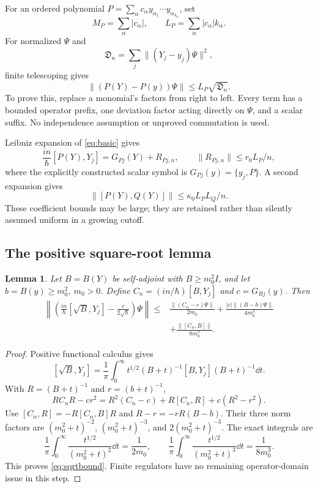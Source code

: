 \documentclass[11pt]{article}
\newtheorem{lemma}[theorem]{Lemma}
\begin{document}
For an ordered polynomial $P=\sum_\alpha c_\alpha y_{\alpha_1}\cdots y_{\alpha_{k_\alpha}}$, set
\[
M_P=\sum_\alpha|c_\alpha|,
\qquad L_P=\sum_\alpha|c_\alpha|k_\alpha.
\]
For normalized $\Psi$ and
\begin{equation}\label{eq:D}
\mathfrak D_n=\sum_j\|(Y_j-y_j)\Psi\|^2,
\end{equation}
finite telescoping gives
\begin{equation}\label{eq:tel}
\|(P(Y)-P(y))\Psi\|\le L_P\sqrt{\mathfrak D_n}.
\end{equation}
To prove this, replace a monomial's factors from right to left. Every term has a bounded operator prefix, one deviation factor acting directly on $\Psi$, and a scalar suffix. No independence assumption or unproved commutation is used.

Leibniz expansion of \eqref{eq:basic} gives
\begin{equation}
\frac{in}{\hbar}[P(Y),Y_j]=G_{Pj}(Y)+R_{Pj,n},
\qquad \|R_{Pj,n}\|\le r_0L_P/n,
\end{equation}
where the explicitly constructed scalar symbol is $G_{Pj}(y)=\{y_j,P\}$. A second expansion gives
\begin{equation}\label{eq:polycomm}
\|[P(Y),Q(Y)]\|\le\kappa_0L_PL_Q/n.
\end{equation}
These coefficient bounds may be large; they are retained rather than silently assumed uniform in a growing cutoff.

\subsection{The positive square-root lemma}
\begin{lemma}\label{lem:sqrt}
Let $B=B(Y)$ be self-adjoint with $B\ge m_0^2I$, and let $b=B(y)\ge m_0^2$, $m_0>0$. Define $C_n=(in/\hbar)[B,Y_j]$ and $c=G_{Bj}(y)$. Then
\begin{equation}\label{eq:sqrtbound}
\begin{split}
\left\|\left(\frac{in}{\hbar}[\sqrt B,Y_j]-\frac{c}{2\sqrt b}\right)\Psi\right\|
\le{}&\frac{\|(C_n-c)\Psi\|}{2m_0}
+\frac{|c|\|(B-b)\Psi\|}{4m_0^3}\\
&+\frac{\|[C_n,B]\|}{8m_0^3}.
\end{split}
\end{equation}
\end{lemma}
\begin{proof}
Positive functional calculus gives
\[
[\sqrt B,Y_j]=\frac1\pi\int_0^\infty
t^{1/2}(B+t)^{-1}[B,Y_j](B+t)^{-1}\dd t.
\]
With $R=(B+t)^{-1}$ and $r=(b+t)^{-1}$,
\[
RC_nR-cr^2=R^2(C_n-c)+R[C_n,R]+c(R^2-r^2).
\]
Use $[C_n,R]=-R[C_n,B]R$ and $R-r=-rR(B-b)$. Their three norm factors are $(m_0^2+t)^{-2}$, $(m_0^2+t)^{-3}$, and $2(m_0^2+t)^{-3}$. The exact integrals are
\[
\frac1\pi\int_0^\infty\frac{t^{1/2}}{(m_0^2+t)^2}\dd t=\frac1{2m_0},
\qquad
\frac1\pi\int_0^\infty\frac{t^{1/2}}{(m_0^2+t)^3}\dd t=\frac1{8m_0^3}.
\]
This proves \eqref{eq:sqrtbound}. Finite regulators have no remaining operator-domain issue in this step.
\end{proof}
\end{document}

